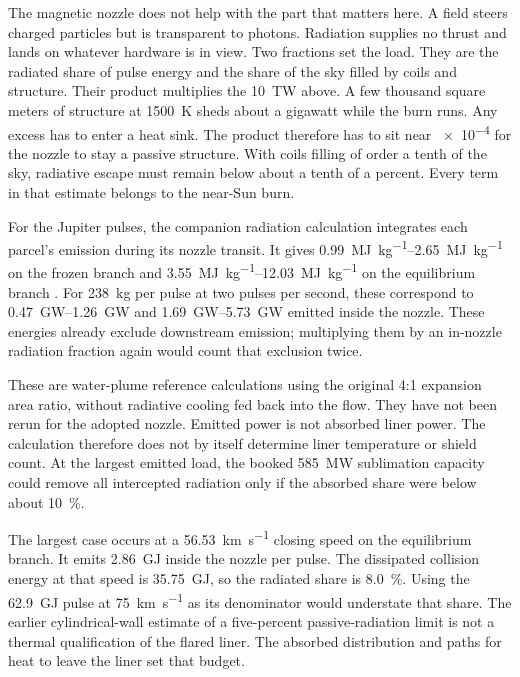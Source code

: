 \documentclass{article}
\begin{document}
The magnetic nozzle does not help with the part that matters here. A field steers charged particles but is transparent to photons. Radiation supplies no thrust and lands on whatever hardware is in view. Two fractions set the load. They are the radiated share of pulse energy and the share of the sky filled by coils and structure. Their product multiplies the \SI{10}{\tera\watt} above. A few thousand square meters of structure at \SI{1500}{\kelvin} sheds about a gigawatt while the burn runs. Any excess has to enter a heat sink. The product therefore has to sit near \num{e-4} for the nozzle to stay a passive structure. With coils filling of order a tenth of the sky, radiative escape must remain below about a tenth of a percent. Every term in that estimate belongs to the near-Sun burn.

For the Jupiter pulses, the companion radiation calculation integrates each parcel's emission during its nozzle transit. It gives \SIrange{0.99}{2.65}{\mega\joule\per\kilogram} on the frozen branch and \SIrange{3.55}{12.03}{\mega\joule\per\kilogram} on the equilibrium branch \cite{Katz_puffsat_impact_sim_2026}. For \SI{238}{\kilogram} per pulse at two pulses per second, these correspond to \SIrange[range-phrase={--},range-units=single]{0.47}{1.26}{\giga\watt} and \SIrange[range-phrase={--},range-units=single]{1.69}{5.73}{\giga\watt} emitted inside the nozzle. These energies already exclude downstream emission; multiplying them by an in-nozzle radiation fraction again would count that exclusion twice.

These are water-plume reference calculations using the original 4:1 expansion area ratio, without radiative cooling fed back into the flow. They have not been rerun for the adopted nozzle. Emitted power is not absorbed liner power. The calculation therefore does not by itself determine liner temperature or shield count. At the largest emitted load, the booked \SI{585}{\mega\watt} sublimation capacity could remove all intercepted radiation only if the absorbed share were below about \SI{10}{\percent}.

The largest case occurs at a \SI{56.53}{\kilo\meter\per\second} closing speed on the equilibrium branch. It emits \SI{2.86}{\giga\joule} inside the nozzle per pulse. The dissipated collision energy at that speed is \SI{35.75}{\giga\joule}, so the radiated share is \SI{8.0}{\percent}. Using the \SI{62.9}{\giga\joule} pulse at \SI{75}{\kilo\meter\per\second} as its denominator would understate that share. The earlier cylindrical-wall estimate of a five-percent passive-radiation limit is not a thermal qualification of the flared liner. The absorbed distribution and paths for heat to leave the liner set that budget.
\end{document}
